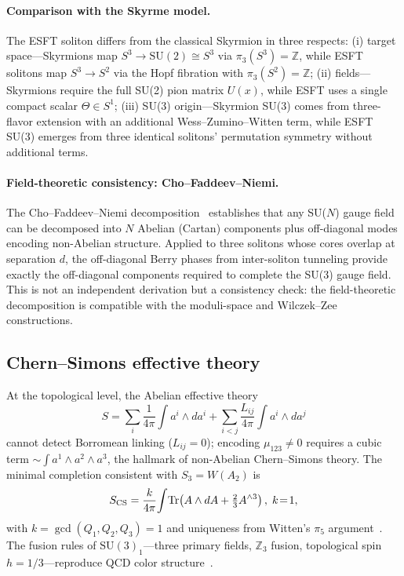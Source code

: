 \documentclass[a4paper,12pt]{article}
\newcommand{\tr}{\mathrm{Tr}}
\begin{document}
\paragraph{Comparison with the Skyrme model.}
The ESFT soliton differs from the classical Skyrmion in three
respects: (i) target space---Skyrmions map
$S^3 \to \mathrm{SU}(2) \cong S^3$ via $\pi_3(S^3) = \mathbb{Z}$,
while ESFT solitons map $S^3 \to S^2$ via the Hopf fibration with
$\pi_3(S^2) = \mathbb{Z}$; (ii) fields---Skyrmions require
the full SU(2) pion matrix $U(x)$, while ESFT uses a single compact
scalar $\Theta \in S^1$; (iii) SU(3) origin---Skyrmion SU(3)
comes from three-flavor extension with an additional
Wess--Zumino--Witten term, while ESFT SU(3) emerges from three
identical solitons' permutation symmetry without additional terms.

\paragraph{Field-theoretic consistency: Cho--Faddeev--Niemi.}
The Cho--Faddeev--Niemi decomposition~\cite{Cho1980,FN1999}
establishes that any SU($N$) gauge field can be decomposed into
$N$ Abelian (Cartan) components plus off-diagonal modes encoding
non-Abelian structure. Applied to three solitons whose cores
overlap at separation $d$, the off-diagonal Berry phases from
inter-soliton tunneling provide exactly the off-diagonal components
required to complete the SU(3) gauge field. This is not an
independent derivation but a consistency check: the field-theoretic
decomposition is compatible with the moduli-space and Wilczek--Zee
constructions.

\subsection{Chern--Simons effective theory}

At the topological level, the Abelian effective theory
\begin{equation}
\label{eq:abelianCS}
 S = \sum_i \frac{1}{4\pi}\!\int a^i \!\wedge da^i
 + \!\sum_{i<j} \frac{L_{ij}}{4\pi}\!\int a^i \!\wedge da^j
\end{equation}
cannot detect Borromean linking ($L_{ij} = 0$); encoding
$\mu_{123} \neq 0$ requires a cubic term
$\sim \int a^1 \wedge a^2 \wedge a^3$, the hallmark of non-Abelian
Chern--Simons theory. The minimal completion consistent with
$S_3 = W(A_2)$ is
\begin{equation}
 S_{\rm CS} = \frac{k}{4\pi}\!\int\! \tr\!\left(
 A \wedge dA + \tfrac{2}{3}A^{\wedge 3}\right),
 \; k\!=\!1,
\end{equation}
with $k = \gcd(Q_1,Q_2,Q_3) = 1$ and uniqueness from
Witten's $\pi_5$ argument~\cite{Witten1983}. The fusion rules of
$\mathrm{SU}(3)_1$---three primary fields, $\mathbb{Z}_3$ fusion,
topological spin $h = 1/3$---reproduce QCD color
structure~\cite{Witten1989}.
\end{document}
